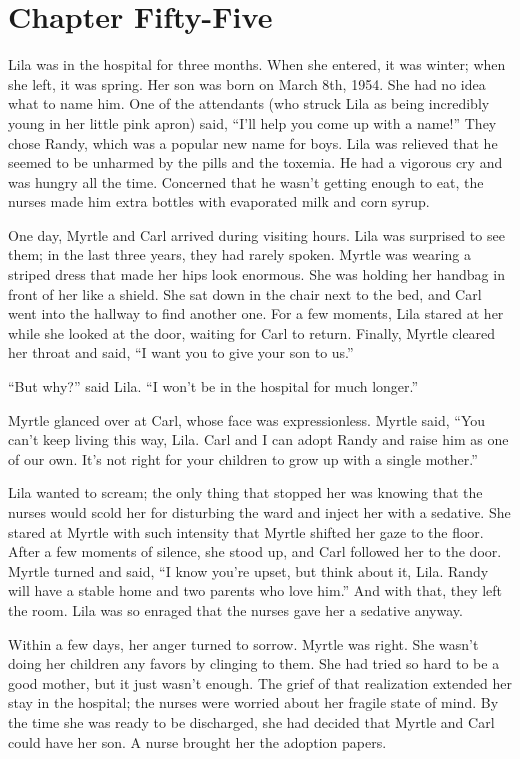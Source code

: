 \documentclass[
  american,
  letterpaper,
]{book}
\begin{document}

\chapter{Chapter Fifty-Five}\label{chapter-fifty-five}

Lila was in the hospital for three months. When she entered, it was
winter; when she left, it was spring. Her son was born on March 8th,
1954. She had no idea what to name him. One of the attendants (who
struck Lila as being incredibly young in her little pink apron) said,
``I'll help you come up with a name!'' They chose Randy, which was a
popular new name for boys. Lila was relieved that he seemed to be
unharmed by the pills and the toxemia. He had a vigorous cry and was
hungry all the time. Concerned that he wasn't getting enough to eat, the
nurses made him extra bottles with evaporated milk and corn syrup.

One day, Myrtle and Carl arrived during visiting hours. Lila was
surprised to see them; in the last three years, they had rarely spoken.
Myrtle was wearing a striped dress that made her hips look enormous. She
was holding her handbag in front of her like a shield. She sat down in
the chair next to the bed, and Carl went into the hallway to find
another one. For a few moments, Lila stared at her while she looked at
the door, waiting for Carl to return. Finally, Myrtle cleared her throat
and said, ``I want you to give your son to us.''

``But why?'' said Lila. ``I won't be in the hospital for much longer.''

Myrtle glanced over at Carl, whose face was expressionless. Myrtle said,
``You can't keep living this way, Lila. Carl and I can adopt Randy and
raise him as one of our own. It's not right for your children to grow up
with a single mother.''

Lila wanted to scream; the only thing that stopped her was knowing that
the nurses would scold her for disturbing the ward and inject her with a
sedative. She stared at Myrtle with such intensity that Myrtle shifted
her gaze to the floor. After a few moments of silence, she stood up, and
Carl followed her to the door. Myrtle turned and said, ``I know you're
upset, but think about it, Lila. Randy will have a stable home and two
parents who love him.'' And with that, they left the room. Lila was so
enraged that the nurses gave her a sedative anyway.

Within a few days, her anger turned to sorrow. Myrtle was right. She
wasn't doing her children any favors by clinging to them. She had tried
so hard to be a good mother, but it just wasn't enough. The grief of
that realization extended her stay in the hospital; the nurses were
worried about her fragile state of mind. By the time she was ready to be
discharged, she had decided that Myrtle and Carl could have her son. A
nurse brought her the adoption papers.
\end{document}
